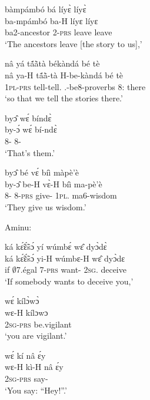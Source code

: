 \begin{exe}[(N234)]
\exN\label{n250}
  \glll bàmpámbó bá líyɛ̀ líyɛ̀ \\
       ba-mpámbó ba-H líyɛ líyɛ \\
         ba2-ancestor 2-\textsc{prs} leave leave \\ 
    \trans `The ancestors leave [the story to us],'
 
\exN\label{n251}
  \glll nâ yá tã́ã̀tà békàndá bé tè \\
        nâ ya-H tã́ã̀-tà H-be-kàndá bé tè \\
        {\COMP} 1\textsc{pl}-\textsc{prs} tell-tell.{\SBJV}  {\OBJ}.{\LINK}-be8-proverbs 8:{\ATT}  there  \\
    \trans `so that we tell the stories there.'
 
\exN\label{n252}
  \glll byɔ̂ wɛ́ bíndɛ̀ \\
       by-ɔ́ wɛ́ bí-ndɛ̀ \\
         8-{\OBJ} {\ID} 8-{\ANA} \\
    \trans `That's them.'
 
\exN\label{n253}
  \glll byɔ̂ bé vɛ́ bíì màpè'è \\
        by-ɔ̂ be-H vɛ̀-H bíì ma-pè'è \\
        8-{\OBJ} 8-\textsc{prs} give-{\R} 1\textsc{pl}.{\OBJ} ma6-wisdom  \\
    \trans `They give us wisdom.'
\end{exe}

\noindent Aminu:

\begin{exe}[(N234)]
\exN\label{n254}
  \glll ká kɛ̃́ɛ̃́sɔ́ yí wúmbɛ́ wɛ̂ dyɔ̀dɛ̀ \\
        ká kɛ̃́ɛ̃́sɔ́ yi-H wúmbɛ-H wɛ̂ dyɔ̀dɛ \\
         if $\emptyset$7.égal 7-\textsc{prs} want-{\R} 2\textsc{sg}.{\OBJ} deceive \\
    \trans `If somebody wants to deceive you,'
 
\exN\label{n255}
  \glll wɛ́ kílɔ̀wɔ̀ \\
        wɛ-H kílɔwɔ \\
         2\textsc{sg}-\textsc{prs} be.vigilant \\
    \trans `you are vigilant.'
 
\exN\label{n256}
  \glll wɛ́ kí nâ ɛ́y \\
       wɛ-H kì-H nâ ɛ́y \\
        2\textsc{sg}-\textsc{prs} say-{\R} {\COMP} {\EXCL}  \\
    \trans `You say: ``Hey!''.'
\end{exe}

